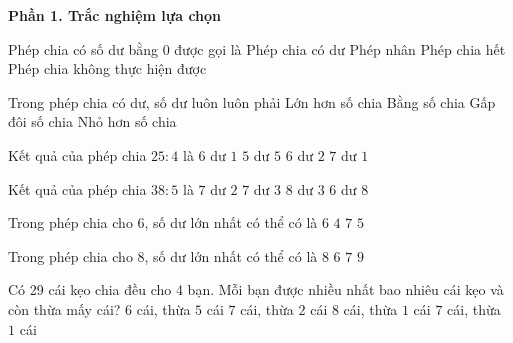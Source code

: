 \textbf{Phần 1. Trắc nghiệm lựa chọn}

\begin{ex} %
Phép chia có số dư bằng 0 được gọi là
\choice
{Phép chia có dư}
{Phép nhân}
{\True Phép chia hết}
{Phép chia không thực hiện được}
\end{ex}

\begin{ex} %
Trong phép chia có dư, số dư luôn luôn phải
\choice
{Lớn hơn số chia}
{Bằng số chia}
{Gấp đôi số chia}
{\True Nhỏ hơn số chia}
\end{ex}

\begin{ex} %
Kết quả của phép chia $25 : 4$ là
\choice
{\True $6$ dư $1$}
{$5$ dư $5$}
{$6$ dư $2$}
{$7$ dư $1$}
\end{ex}

\begin{ex} %
Kết quả của phép chia $38 : 5$ là
\choice
{$7$ dư $2$}
{\True $7$ dư $3$}
{$8$ dư $3$}
{$6$ dư $8$}
\end{ex}

\begin{ex} %
Trong phép chia cho 6, số dư lớn nhất có thể có là
\choice
{$6$}
{$4$}
{$7$}
{\True $5$}
\end{ex}

\begin{ex} %
Trong phép chia cho 8, số dư lớn nhất có thể có là
\choice
{$8$}
{$6$}
{\True $7$}
{$9$}
\end{ex}

\begin{ex} %
Có 29 cái kẹo chia đều cho 4 bạn. Mỗi bạn được nhiều nhất bao nhiêu cái kẹo và còn thừa mấy cái?
\choice
{$6$ cái, thừa $5$ cái}
{$7$ cái, thừa $2$ cái}
{$8$ cái, thừa $1$ cái}
{\True $7$ cái, thừa $1$ cái}
\end{ex}

